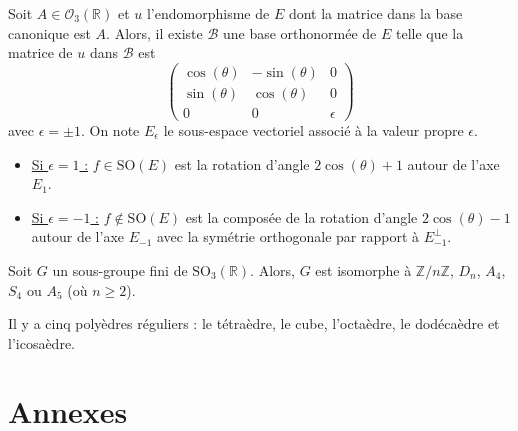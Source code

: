   \begin{theorem}
    Soit $A \in \mathcal{O}_3(\mathbb{R})$ et $u$ l'endomorphisme de $E$ dont la matrice dans la base canonique est $A$. Alors, il existe $\mathcal{B}$ une base orthonormée de $E$ telle que la matrice de $u$ dans $\mathcal{B}$ est
    \[ \begin{pmatrix} \cos(\theta) & -\sin(\theta) & 0 \\ \sin(\theta) & \cos(\theta) & 0 \\ 0 & 0 & \epsilon \end{pmatrix} \]
    avec $\epsilon = \pm 1$. On note $E_\epsilon$ le sous-espace vectoriel associé à la valeur propre $\epsilon$.
    \begin{itemize}
      \item \uline{Si $\epsilon = 1$ :} $f \in \mathrm{SO}(E)$ est la rotation d'angle $2\cos(\theta) + 1$ autour de l'axe $E_1$.
      \item \uline{Si $\epsilon = -1$ :} $f \notin \mathrm{SO}(E)$ est la composée de la rotation d'angle $2\cos(\theta) - 1$ autour de l'axe $E_{-1}$ avec la symétrie orthogonale par rapport à $E_{-1}^{\perp}$.
    \end{itemize}
  \end{theorem}


  \begin{theorem}
    Soit $G$ un sous-groupe fini de $\mathrm{SO}_3(\mathbb{R})$. Alors, $G$ est isomorphe à $\mathbb{Z}/n\mathbb{Z}$, $D_n$, $A_4$, $S_4$ ou $A_5$ (où $n \geq 2$).
  \end{theorem}

  \begin{application}
    Il y a cinq polyèdres réguliers : le tétraèdre, le cube, l'octaèdre, le dodécaèdre et l'icosaèdre.
  \end{application}

  \newpage
  \section*{Annexes}


